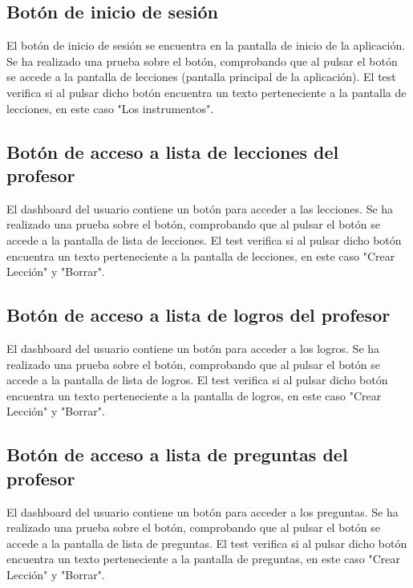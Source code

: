 \subsection{Botón de inicio de sesión}
\label{subsec:pruebas-controlador-boton-inicio-sesión}
El botón de inicio de sesión se encuentra en la pantalla de inicio de la aplicación. Se ha realizado una prueba sobre el botón, comprobando que al pulsar el botón se accede a la pantalla de lecciones (pantalla principal de la aplicación).
El test verifica si al pulsar dicho botón encuentra un texto perteneciente a la pantalla de lecciones, en este caso "Los instrumentos".

\subsection{Botón de acceso a lista de lecciones del profesor}
\label{subsec:pruebas-controlador-boton-lecciones}
El dashboard del usuario contiene un botón para acceder a las lecciones. Se ha realizado una prueba sobre el botón, comprobando que al pulsar el botón se accede a la pantalla de lista de lecciones. 
El test verifica si al pulsar dicho botón encuentra un texto perteneciente a la pantalla de lecciones, en este caso "Crear Lección" y "Borrar".

\subsection{Botón de acceso a lista de logros del profesor}
\label{subsec:pruebas-controlador-boton-logros}
El dashboard del usuario contiene un botón para acceder a los logros. Se ha realizado una prueba sobre el botón, comprobando que al pulsar el botón se accede a la pantalla de lista de logros. 
El test verifica si al pulsar dicho botón encuentra un texto perteneciente a la pantalla de logros, en este caso "Crear Lección" y "Borrar".

\subsection{Botón de acceso a lista de preguntas del profesor}
\label{subsec:pruebas-controlador-boton-preguntas}
El dashboard del usuario contiene un botón para acceder a los preguntas. Se ha realizado una prueba sobre el botón, comprobando que al pulsar el botón se accede a la pantalla de lista de preguntas. 
El test verifica si al pulsar dicho botón encuentra un texto perteneciente a la pantalla de preguntas, en este caso "Crear Lección" y "Borrar".

